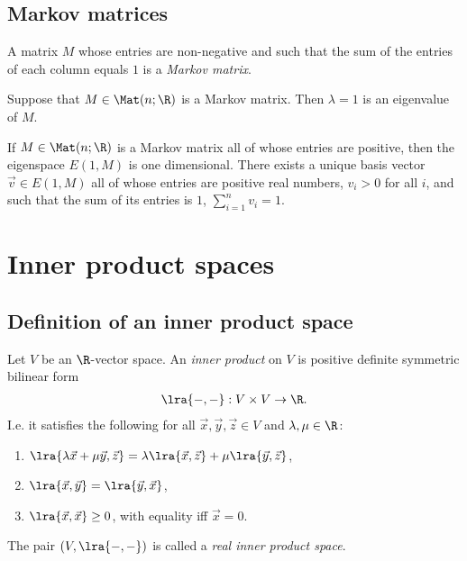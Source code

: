 \documentclass{article}
\begin{document}
\subsection{Markov matrices}

\begin{definition}
	A matrix $M$ whose entries are non-negative and such that the sum of the entries of each
	column equals $1$ is a \emph{Markov matrix}.
\end{definition}

\begin{lemma}[Notes 4.7.6]
	Suppose that $M\in\Mat(n;\R)$ is a Markov matrix. Then $\lambda=1$ is an eigenvalue of $M$.
\end{lemma}

\begin{theorem}[Perron]
	If $M\in\Mat(n;\R)$ is a Markov matrix all of whose entries are positive, then the eigenspace
	$E(1,M)$ is one dimensional. There exists a unique basis vector $\vec v\in E(1,M)$ all of whose
	entries are positive real numbers, $v_i>0$ for all $i$, and such that the sum of its entries is $1$,
	$\sum_{i=1}^n v_i=1$.
\end{theorem}

\section{Inner product spaces}

\subsection{Definition of an inner product space}

\begin{definition}
	Let $V$ be an $\R$-vector space. An \emph{inner product} on $V$ is positive definite symmetric bilinear 
	form
	\begin{align*}
		\lra{-,-}:V\times V\to\R.
	\end{align*}
	I.e. it satisfies the following for all $\vec x,\vec y,\vec z\in V$ and $\lambda,\mu\in\R$:
	\begin{enumerate}
		\item $\lra{\lambda\vec x+\mu\vec y,\vec z}=\lambda\lra{\vec x,\vec z}+\mu\lra{\vec y,\vec z}$,
		\item $\lra{\vec x,\vec y}=\lra{\vec y,\vec x}$,
		\item $\lra{\vec x,\vec x}\geq 0$, with equality iff $\vec x =0$.
	\end{enumerate}
	The pair $(V,\lra{-,-})$ is called a \emph{real inner product space}.
\end{definition}
\end{document}

